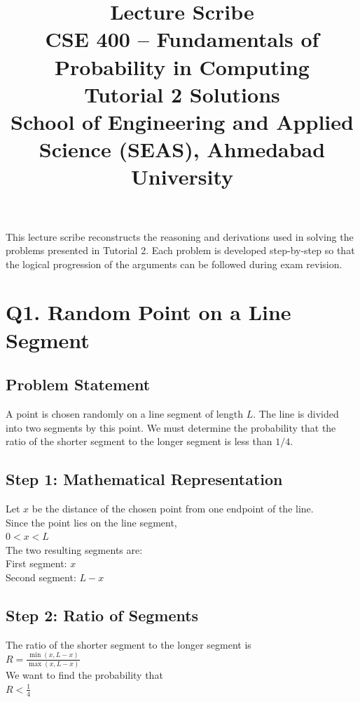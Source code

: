 \documentclass{article}
\begin{document}
\title{Lecture Scribe \\ CSE 400 – Fundamentals of Probability in Computing \\ Tutorial 2 Solutions \\ School of Engineering and Applied Science (SEAS), Ahmedabad University}
\maketitle

This lecture scribe reconstructs the reasoning and derivations used in solving the problems presented in Tutorial 2. Each problem is developed step-by-step so that the logical progression of the arguments can be followed during exam revision.

\section{Q1. Random Point on a Line Segment}

\subsection{Problem Statement}
A point is chosen randomly on a line segment of length $L$. The line is divided into two segments by this point. We must determine the probability that the ratio of the shorter segment to the longer segment is less than $1/4$.

\subsection{Step 1: Mathematical Representation}
Let $x$ be the distance of the chosen point from one endpoint of the line. \\
Since the point lies on the line segment, \\
$0 < x < L$ \\
The two resulting segments are: \\
First segment: $x$ \\
Second segment: $L-x$

\subsection{Step 2: Ratio of Segments}
The ratio of the shorter segment to the longer segment is \\
$R = \frac{\min(x, L-x)}{\max(x, L-x)}$ \\
We want to find the probability that \\
$R < \frac{1}{4}$
\end{document}
